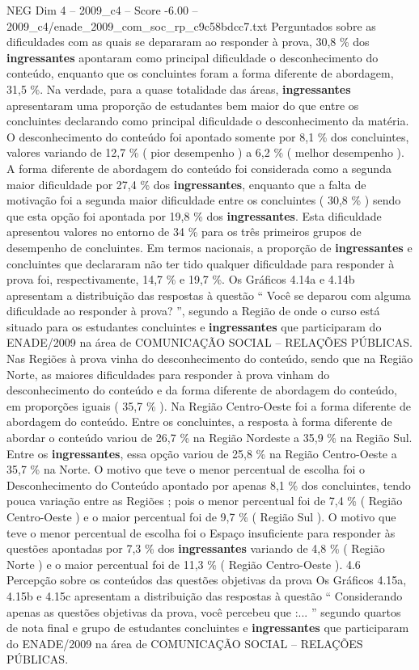 \begin{textsample}{NEG Dim 4 – 2009\_c4 – Score -6.00 – 2009\_c4/enade\_2009\_com\_soc\_rp\_c9c58bdcc7.txt}
Perguntados sobre as dificuldades com as quais se depararam ao responder à prova, 30,8 \% dos \textbf{ingressantes} apontaram como principal dificuldade o desconhecimento do conteúdo, enquanto que os concluintes foram a forma diferente de abordagem, 31,5 \%.
Na verdade, para a quase totalidade das áreas, \textbf{ingressantes} apresentaram uma proporção de estudantes bem maior do que entre os concluintes declarando como principal dificuldade o desconhecimento da matéria.
O desconhecimento do conteúdo foi apontado somente por 8,1 \% dos concluintes, valores variando de 12,7 \% ( pior desempenho ) a 6,2 \% ( melhor desempenho ).
A forma diferente de abordagem do conteúdo foi considerada como a segunda maior dificuldade por 27,4 \% dos \textbf{ingressantes}, enquanto que a falta de motivação foi a segunda maior dificuldade entre os concluintes ( 30,8 \% ) sendo que esta opção foi apontada por 19,8 \% dos \textbf{ingressantes}.
Esta dificuldade apresentou valores no entorno de 34 \% para os três primeiros grupos de desempenho de concluintes.
Em termos nacionais, a proporção de \textbf{ingressantes} e concluintes que declararam não ter tido qualquer dificuldade para responder à prova foi, respectivamente, 14,7 \% e 19,7 \%.
Os Gráficos 4.14a e 4.14b apresentam a distribuição das respostas à questão “ Você se deparou com alguma dificuldade ao responder à prova? ”, segundo a Região de onde o curso está situado para os estudantes concluintes e \textbf{ingressantes} que participaram do ENADE/2009 na área de COMUNICAÇÃO SOCIAL – RELAÇÕES PÚBLICAS.
Nas Regiões à prova vinha do desconhecimento do conteúdo, sendo que na Região Norte, as maiores dificuldades para responder à prova vinham do desconhecimento do conteúdo e da forma diferente de abordagem do conteúdo, em proporções iguais ( 35,7 \% ).
Na Região Centro-Oeste foi a forma diferente de abordagem do conteúdo.
Entre os concluintes, a resposta à forma diferente de abordar o conteúdo variou de 26,7 \% na Região Nordeste a 35,9 \% na Região Sul.
Entre os \textbf{ingressantes}, essa opção variou de 25,8 \% na Região Centro-Oeste a 35,7 \% na Norte.
O motivo que teve o menor percentual de escolha foi o Desconhecimento do Conteúdo apontado por apenas 8,1 \% dos concluintes, tendo pouca variação entre as Regiões ; pois o menor percentual foi de 7,4 \% ( Região Centro-Oeste ) e o maior percentual foi de 9,7 \% ( Região Sul ).
O motivo que teve o menor percentual de escolha foi o Espaço insuficiente para responder às questões apontadas por 7,3 \% dos \textbf{ingressantes} variando de 4,8 \% ( Região Norte ) e o maior percentual foi de 11,3 \% ( Região Centro-Oeste ). 4.6 Percepção sobre os conteúdos das questões objetivas da prova Os Gráficos 4.15a, 4.15b e 4.15c apresentam a distribuição das respostas à questão “ Considerando apenas as questões objetivas da prova, você percebeu que :... ” segundo quartos de nota final e grupo de estudantes concluintes e \textbf{ingressantes} que participaram do ENADE/2009 na área de COMUNICAÇÃO SOCIAL – RELAÇÕES PÚBLICAS.

\end{textsample}
